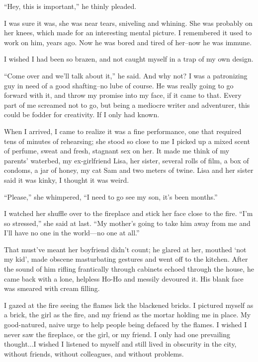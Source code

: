 ``Hey, this is important,'' he thinly pleaded.

I was sure it was, she was near tears, sniveling and whining. She was
probably on her knees, which made for an interesting mental picture. I
remembered it used to work on him, years ago. Now he was bored and tired
of her--now he was immune.

I wished I had been so brazen, and not caught myself in a trap of my own
design.

``Come over and we'll talk about it,'' he said. And why not? I was a
patronizing guy in need of a good shafting--no lube of course. He was
really going to go forward with it, and throw my promise into my face,
if it came to that. Every part of me screamed not to go, but being a
mediocre writer and adventurer, this could be fodder for creativity. If
I only had known.

When I arrived, I came to realize it was a fine performance, one that
required tens of minutes of rehearsing; she stood so close to me I
picked up a mixed scent of perfume, sweat and fresh, stagnant sex on
her. It made me think of my parents' waterbed, my ex-girlfriend Lisa,
her sister, several rolls of film, a box of condoms, a jar of honey, my
cat Sam and two meters of twine. Lisa and her sister said it was kinky,
I thought it was weird.

``Please,'' she whimpered, ``I need to go see my son, it's been
months.''

I watched her shuffle over to the fireplace and stick her face close to
the fire. ``I'm so stressed,'' she said at last. ``My mother's going to
take him away from me and I'll have no one in the world---no one at
all.''

That must've meant her boyfriend didn't count; he glared at her, mouthed
`not my kid', made obscene masturbating gestures and went off to the
kitchen. After the sound of him rifling frantically through cabinets
echoed through the house, he came back with a lone, helpless Ho-Ho and
messily devoured it. His blank face was smeared with cream filling.

I gazed at the fire seeing the flames lick the blackened bricks. I
pictured myself as a brick, the girl as the fire, and my friend as the
mortar holding me in place. My good-natured, naive urge to help people
being defaced by the flames. I wished I never saw the fireplace, or the
girl, or my friend. I only had one prevailing thought...I wished I
listened to myself and still lived in obscurity in the city, without
friends, without colleagues, and without problems.


